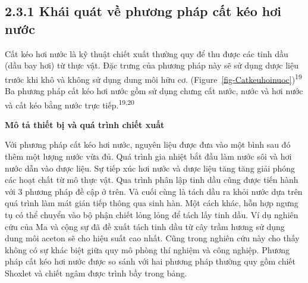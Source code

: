 \documentclass[
  twocolumn,
  landscape]{report}
\begin{document}
\subsection{2.3.1 Khái quát về phương pháp cất kéo hơi
nước}\label{khuxe1i-quuxe1t-vux1ec1-phux1b0ux1a1ng-phuxe1p-cux1ea5t-kuxe9o-hux1a1i-nux1b0ux1edbc}

Cất kéo hơi nước là kỹ thuật chiết xuất thường quy để thu được các tinh
dầu (dầu bay hơi) từ thực vật. Đặc trưng của phương pháp này sẽ sử dụng
dược liệu trước khi khô và không sử dụng dung môi hữu cơ.
(Figure~\ref{fig-Catkeuhoinuoc})\textsuperscript{19} Ba phương pháp cất
kéo hơi nước gồm sử dụng chưng cất nước, nước và hơi nước và cất kéo
bằng nước trực tiếp.\textsuperscript{19,20}

\textbf{Mô tả thiết bị và quá trình chiết xuất}

Với phương pháp cất kéo hơi nước, nguyên liệu được đưa vào một bình sau
đó thêm một lượng nước vừa đủ. Quá trình gia nhiệt bắt đầu làm nước sôi
và hơi nước dẫn vào dược liệu. Sự tiếp xúc hơi nước và dược liệu tăng
tăng giải phóng các hoạt chất từ mô thực vật. Qua trình phân lập tinh
dầu cũng được tiến hành với 3 phương pháp đề cập ở trên. Và cuối cùng là
tách dầu ra khỏi nước dựa trên quá trình làm mát gián tiếp thông qua
sinh hàn. Một cách khác, hỗn hợp ngưng tụ có thể chuyển vào bộ phận
chiết lỏng lỏng để tách lấy tinh dầu. Ví dụ nghiên cứu của Ma và cộng sự
đã đề xuất tách tinh dầu từ cây trầm hương sử dụng dung môi aceton sẽ
cho hiệu suất cao nhất. Cũng trong nghiên cứu này cho thấy không có sự
khác biệt giữa quy mô phòng thí nghiệm và công nghiệp. Phương pháp cất
kéo hơi nước được so sánh với hai phương pháp thường quy gồm chiết
Shoxlet và chiết ngâm được trình bầy trong bảng.
\end{document}

